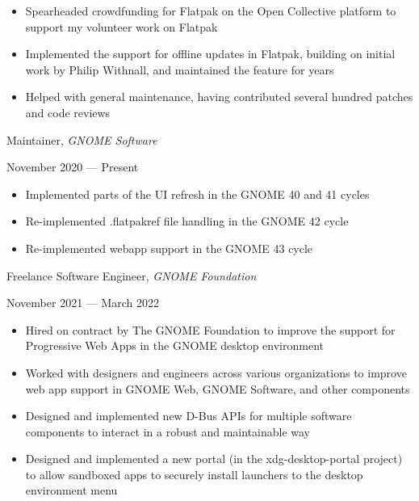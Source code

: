 \documentclass[11pt]{article}
\begin{document}
\begin{itemize}
  \item Spearheaded crowdfunding for Flatpak on the Open Collective platform to support my volunteer work on Flatpak
  \item Implemented the support for offline updates in Flatpak, building on initial work by Philip Withnall, and maintained the feature for years
  \item Helped with general maintenance, having contributed several hundred patches and code reviews
\end{itemize}

\begin{minipage}[t]{0.65\textwidth}
\flushleft
Maintainer, \textit{GNOME Software}\\
\end{minipage}
\begin{minipage}[t]{0.30\textwidth}
\flushright
November 2020 --- Present\\
\end{minipage}

\begin{itemize}
  \item Implemented parts of the UI refresh in the GNOME 40 and 41 cycles
  \item Re-implemented .flatpakref file handling in the GNOME 42 cycle
  \item Re-implemented webapp support in the GNOME 43 cycle
\end{itemize}

\begin{minipage}[t]{0.65\textwidth}
\flushleft
Freelance Software Engineer, \textit{GNOME Foundation}\\
\end{minipage}
\begin{minipage}[t]{0.30\textwidth}
\flushright
November 2021 --- March 2022\\
\end{minipage}

\begin{itemize}
  \item Hired on contract by The GNOME Foundation to improve the support for Progressive Web Apps in the GNOME desktop environment
  \item Worked with designers and engineers across various organizations to improve web app support in GNOME Web, GNOME Software, and other components
  \item Designed and implemented new D-Bus APIs for multiple software components to interact in a robust and maintainable way
  \item Designed and implemented a new portal (in the xdg-desktop-portal project) to allow sandboxed apps to securely install launchers to the desktop environment menu
\end{itemize}
\end{document}
